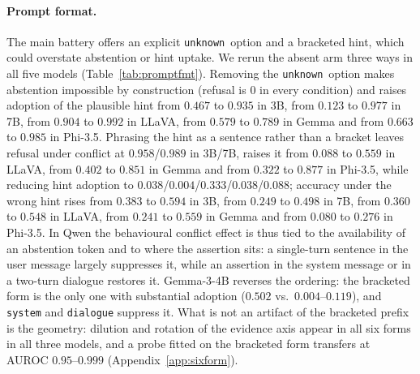 \documentclass[10pt]{article}
\newcommand{\unknown}{\texttt{unknown}}
\begin{document}
\paragraph{Prompt format.}
The main battery offers an explicit \unknown\ option and a bracketed hint, which could overstate abstention or hint uptake. We rerun the absent arm three ways in all five models (Table~\ref{tab:promptfmt}). Removing the \unknown\ option makes abstention impossible by construction (refusal is $0$ in every condition) and raises adoption of the plausible hint from $0.467$ to $0.935$ in 3B, from $0.123$ to $0.977$ in 7B, from $0.904$ to $0.992$ in LLaVA, from $0.579$ to $0.789$ in Gemma and from $0.663$ to $0.985$ in Phi-3.5. Phrasing the hint as a sentence rather than a bracket leaves refusal under conflict at $0.958$/$0.989$ in 3B/7B, raises it from $0.088$ to $0.559$ in LLaVA, from $0.402$ to $0.851$ in Gemma and from $0.322$ to $0.877$ in Phi-3.5, while reducing hint adoption to $0.038$/$0.004$/$0.333$/$0.038$/$0.088$; accuracy under the wrong hint rises from $0.383$ to $0.594$ in 3B, from $0.249$ to $0.498$ in 7B, from $0.360$ to $0.548$ in LLaVA, from $0.241$ to $0.559$ in Gemma and from $0.080$ to $0.276$ in Phi-3.5. In Qwen the behavioural conflict effect is thus tied to the availability of an abstention token and to where the assertion sits: a single-turn sentence in the user message largely suppresses it, while an assertion in the system message or in a two-turn dialogue restores it. Gemma-3-4B reverses the ordering: the bracketed form is the only one with substantial adoption ($0.502$ vs.\ $0.004$--$0.119$), and \texttt{system} and \texttt{dialogue} suppress it. What is not an artifact of the bracketed prefix is the geometry: dilution and rotation of the evidence axis appear in all six forms in all three models, and a probe fitted on the bracketed form transfers at AUROC $0.95$--$0.999$ (Appendix~\ref{app:sixform}).
\end{document}
